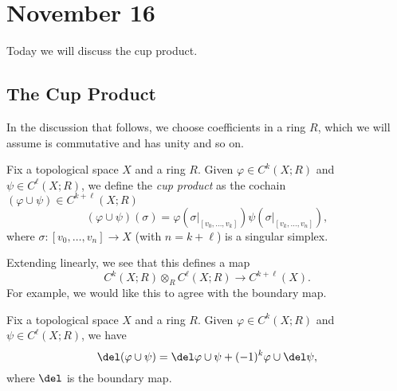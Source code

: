 \documentclass[../notes.tex]{subfiles}
\begin{document}
\section{November 16}

Today we will discuss the cup product.

\subsection{The Cup Product}
In the discussion that follows, we choose coefficients in a ring $R$, which we will assume is commutative and has unity and so on.
\begin{definition}
	Fix a topological space $X$ and a ring $R$. Given $\varphi\in C^k(X;R)$ and $\psi\in C^\ell(X;R)$, we define the \textit{cup product} as the cochain $(\varphi\cup\psi)\in C^{k+\ell}(X;R)$
	\[(\varphi\cup\psi)(\sigma)=\varphi(\sigma|_{[v_0,\ldots,v_k]})\psi(\sigma|_{[v_k,\ldots,v_n]}),\]
	where $\sigma\colon[v_0,\ldots,v_n]\to X$ (with $n=k+\ell$) is a singular simplex.
\end{definition}
Extending linearly, we see that this defines a map
\[C^k(X;R)\otimes_RC^\ell(X;R)\to C^{k+\ell}(X).\]
For example, we would like this to agree with the boundary map.
\begin{lemma} \label{lem:diff-on-cocycle}
	Fix a topological space $X$ and a ring $R$. Given $\varphi\in C^k(X;R)$ and $\psi\in C^\ell(X;R)$, we have
	\[\del(\varphi\cup\psi)=\del\varphi\cup\psi+(-1)^k\varphi\cup\del\psi,\]
	where $\del$ is the boundary map.
\end{lemma}
\end{document}
